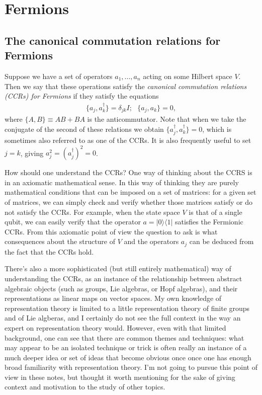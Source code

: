 \documentclass[12pt]{article}
\begin{document}


\section{Fermions}

\subsection{The canonical commutation relations for Fermions}

Suppose we have a set of operators $a_1,\ldots,a_n$ acting on some
Hilbert space $V$.  Then we say that these operations satisfy the
\emph{canonical commutation relations (CCRs) for Fermions} if they
satisfy the equations
\begin{eqnarray}
  \{ a_j, a_k^\dagger \} = \delta_{jk} I; \,\,\,\, \{ a_j,a_k \} = 0,
\end{eqnarray}
where $\{ A, B \} \equiv AB+BA$ is the anticommutator.  Note that when
we take the conjugate of the second of these relations we obtain $\{
a_j^\dagger, a_k^\dagger \} = 0$, which is sometimes also referred to
as one of the CCRs.  It is also frequently useful to set $j = k$,
giving $a_j^2 = (a_j^\dagger)^2 = 0$.

How should one understand the CCRs?  One way of thinking about the
CCRS is in an axiomatic mathematical sense.  In this way of thinking
they are purely mathematical conditions that can be imposed on a set
of matrices: for a given set of matrices, we can simply check and
verify whether those matrices satisfy or do not satisfy the CCRs.  For
example, when the state space $V$ is that of a single qubit, we can
easily verify that the operator $a = |0\rangle \langle 1|$ satisfies
the Fermionic CCRs.  From this axiomatic point of view the question to
ask is what consequences about the structure of $V$ and the operators
$a_j$ can be deduced from the fact that the CCRs hold.  

There's also a more sophisticated (but still entirely mathematical)
way of understanding the CCRs, as an instance of the relationship
between abstract algebraic objects (such as groups, Lie algebras, or
Hopf algebras), and their representations as linear maps on vector
spaces.  My own knowledge of representation theory is limited to a
little representation theory of finite groups and of Lie algberas, and
I certainly do not see the full context in the way an expert on
representation theory would.  However, even with that limited
background, one can see that there are common themes and techniques:
what may appear to be an isolated technique or trick is often really
an instance of a much deeper idea or set of ideas that become obvious
once once one has enough broad familiarity with representation theory.
I'm not going to pursue this point of view in these notes, but thought
it worth mentioning for the sake of giving context and motivation to
the study of other topics.
\end{document}
